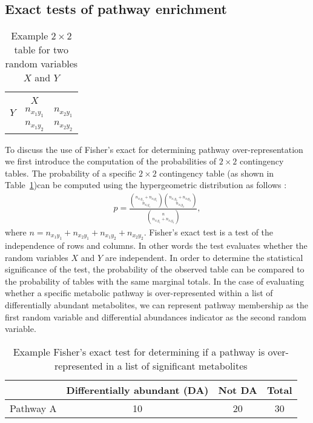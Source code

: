 \begin{DoubleSpace*}
\section{Exact tests of pathway enrichment}
\begin{table}
		\caption[$2 \times 2 $ table]{Example $2 \times 2$ table for two random variables $X$ and $Y$ \label{tab:twoByTwo} }
	\centering
	\begin{tabular}{l  | c  c}
		& & \\
		 &	$X$ & \\
		\hline
		$Y$ & $n_{x_1 y_1}$ & $n_{x_2 y_1}$ \\
		& $n_{x_1 y_2}$ & $n_{x_2 y_2}$ \\
	\end{tabular}
\end{table}
To discuss the use of Fisher's exact for determining pathway over-representation we first introduce the computation of the probabilities of $2 \times 2$ contingency tables. The probability of a specific $2\times 2$ contingency table (as shown in Table~\ref{tab:twoByTwo})can be computed using the hypergeometric distribution as follows \cite{agresti2013}:
\begin{align}
	p = \frac{{n_{x_1 y_1}+n_{x_2 y_1}\choose n_{x_1 y_1}} {n_{x_1 y_2}+n_{x_2 y_2}\choose n_{x_1 y_2}} }{{n\choose n_{x_1 y_1}+n_{x_1 y_2}}},
\end{align}
where $n=n_{x_1 y_1}+  n_{x_2 y_1} +n_{x_1 y_2}+n_{x_2 y_2}$. Fisher's exact test is a test of the independence of rows and columns. In other words the test evaluates whether the random variables $X$ and $Y$ are independent. In order to determine the statistical significance of the test, the probability of the observed table can be compared to the probability of tables with the same marginal totals. In the case of evaluating whether a specific metabolic pathway is over-represented within a list of differentially abundant metabolites, we can represent pathway membership as the first random variable and differential abundances indicator as the second random variable. 
\begin{table}[h!]
	\caption[Exact test]{Example Fisher's exact test for determining if a pathway is over-represented in a list of significant metabolites \label{tab:pathExact} }
	\begin{center}
		\begin{tabular}{ l c c c }
			\hline
			& Differentially abundant (DA) & Not DA & Total \\
			\hline
			Pathway A & 10 & 20 & 30 \\

\end{tabular}
\end{center}
\end{table}
\end{DoubleSpace*}
